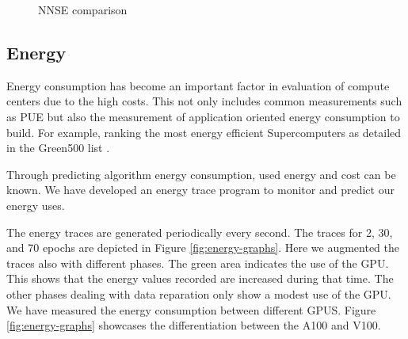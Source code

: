 \documentclass[utf8]{FrontiersinVancouver} %
\begin{document}
{\begin{figure}[p]
  \caption {NNSE comparison}
  \label{fig:NNSE-history-a100}

\end{figure}


\subsection{Energy}
\label{sec:perf-energy}


Energy consumption has become an important factor in evaluation of
compute centers due to the high costs. This not only includes common
measurements such as PUE but also the measurement of application
oriented energy consumption to build. For example, ranking the most
energy efficient Supercomputers as detailed in the Green500 list
\citep{green500}.

Through predicting algorithm energy consumption, used energy and cost
can be known. We have developed an energy trace program to monitor and
predict our energy uses.

The energy traces are generated periodically every second. The traces
for 2, 30, and 70 epochs are depicted in Figure
\ref{fig:energy-graphs}.  Here we augmented the traces also with
different phases. The green area indicates the use of the GPU. This
shows that the energy values recorded are increased during that
time. The other phases dealing with data reparation only show a modest
use of the GPU. We have measured the energy consumption between
different GPUS. Figure \ref{fig:energy-graphs} showcases the
differentiation between the A100 and V100.


\begin{figure}[htb]

  \begin{center}


\end{center}
\end{figure}}
\end{document}
